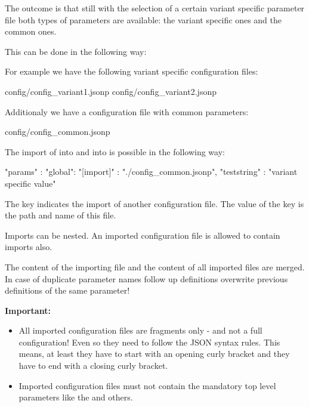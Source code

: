 The outcome is that still with the selection of a certain variant specific parameter file both types of parameters are available:
the variant specific ones and the common ones.

This can be done in the following way:

For example we have the following variant specific configuration files:

\begin{pythonlog}
config/config_variant1.jsonp
config/config_variant2.jsonp
\end{pythonlog}

Additionaly we have a configuration file with common parameters:

\begin{pythonlog}
config/config_common.jsonp
\end{pythonlog}

The import of  into  and into  is possible in the following way:

\begin{pythonlog}
"params" : {
            "global": {
                       "[import]"   : "./config_common.jsonp",
                       "teststring" : "variant specific value"
                      }
           }
\end{pythonlog}

The key \pcode{[import]} indicates the import of another configuration file. The value of the key is the path and name of this file.

Imports can be nested. An imported configuration file is allowed to contain imports also.

The content of the importing file and the content of all imported files are merged. In case of duplicate parameter names follow up definitions
overwrite previous definitions of the same parameter!

\textbf{Important:}

\begin{itemize}
   \item All imported configuration files are fragments only - and not a full configuration! Even so they need to follow the JSON syntax rules.
         This means, at least they have to start with an opening curly bracket and they have to end with a closing curly bracket.
   \item Imported configuration files must not contain the mandatory top level parameters like the  and others.
\end{itemize}

